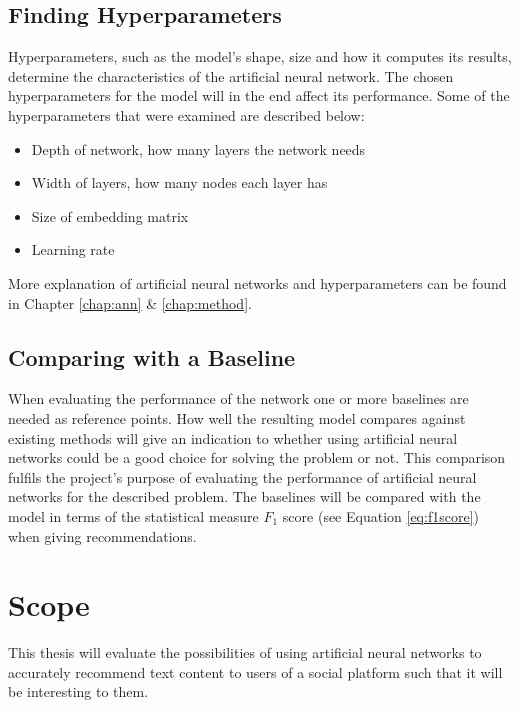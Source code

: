 \subsection{Finding Hyperparameters}
Hyperparameters, such as the model's shape, size and how it computes its results, determine the characteristics of the artificial neural network. The chosen hyperparameters for the model will in the end affect its performance. Some of the hyperparameters that were examined are described below:
\vspace*{0.25cm}
\begin{itemize}
    \item Depth of network, how many layers the network needs
    \item Width of layers, how many nodes each layer has
    \item Size of embedding matrix
    \item Learning rate
\end{itemize}
More explanation of artificial neural networks and hyperparameters can be found in Chapter \ref{chap:ann} \& \ref{chap:method}.

\subsection{Comparing with a Baseline}
When evaluating the performance of the network one or more baselines are needed as reference points. How well the resulting model compares against existing methods will give an indication to whether using artificial neural networks could be a good choice for solving the problem or not. This comparison fulfils the project's purpose of evaluating the performance of artificial neural networks for the described problem. The baselines will be compared with the model in terms of the statistical measure $F_1$ score (see Equation \ref{eq:f1score}) when giving recommendations.

\section{Scope}
This thesis will evaluate the possibilities of using artificial neural networks to accurately recommend text content to users of a social platform such that it will be interesting to them.

